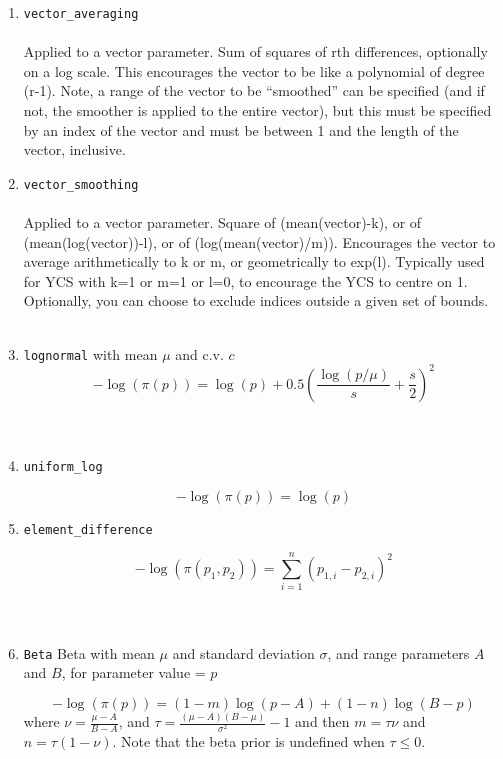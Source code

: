 \begin{enumerate}
	\item \texttt{vector\_averaging}
	\\\\	
	Applied to a vector parameter. Sum of squares of rth differences, optionally on a log scale. This encourages the vector to be like a polynomial of degree (r-1). Note, a range of the vector to be “smoothed” can be specified (and if not, the smoother is applied to the entire vector), but this must be specified by an index of the vector and must be between 1 and the length of the vector, inclusive.
	\item \texttt{vector\_smoothing}
	\\\\
	Applied to a vector parameter. Square of (mean(vector)-k), or of (mean(log(vector))-l), or of (log(mean(vector)/m)). Encourages the vector to average arithmetically to k or m, or geometrically to exp(l). Typically used for YCS with k=1 or m=1 or l=0, to encourage the YCS to centre on 1. Optionally, you can choose to exclude indices outside a given set of bounds.
	\\\\
	\item\texttt{lognormal}
	 with mean $\mu$ and c.v. $c$
	\begin{equation}
	- \log \left(\pi \left(p \right) \right) = \log \left( p \right) + 0.5 \left( \frac{\log \left( p / \mu \right)}{s} + \frac{s}{2} \right)^2
	\end{equation}
	\\\\
	\item\texttt{uniform\_log}
	
	\begin{equation}
	- \log \left(\pi \left(p \right) \right) = \log \left( p \right)
	\end{equation}	
	\item\texttt{element\_difference}

	\begin{equation}
	- \log \left(\pi \left(p_1,p_2 \right) \right) = \sum_{i = 1}^n \left( p_{1,i} - p_{2,i} \right)^2
	\end{equation}		
	\\\\
	\item\texttt{Beta}
	{Beta with mean $\mu$ and standard deviation $\sigma$, and range parameters $A$ and $B$, for parameter value = $p$}
	
	\begin{equation}
	- \log \left(\pi \left( p \right) \right) = \left( 1 - m \right) \log \left( p - A \right) + \left( 1 - n \right)\log \left( B - p \right)
	\end{equation}	
	where $\nu  = \frac{\mu  - A}{B - A}$, and $\tau = \frac{\left(\mu -A \right)\left(B - \mu \right)}{\sigma ^2} - 1$ and then $m=\tau \nu$ and $n=\tau(1-\nu)$. Note that the beta prior is undefined when $\tau \leq 0$.
\end{enumerate}

